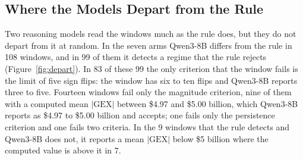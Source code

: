 \subsection{Where the Models Depart from the Rule}
\label{sec:results:departures}

Two reasoning models read the windows much as the rule does, but they do not depart from it at random. In the seven arms Qwen3-8B differs from the rule in 108 windows, and in 99 of them it detects a regime that the rule rejects (Figure~\ref{fig:depart}). In 83 of these 99 the only criterion that the window fails is the limit of five sign flips: the window has six to ten flips and Qwen3-8B reports three to five. Fourteen windows fail only the magnitude criterion, nine of them with a computed mean $|\mathrm{GEX}|$ between \$4.97 and \$5.00 billion, which Qwen3-8B reports as \$4.97 to \$5.00 billion and accepts; one fails only the persistence criterion and one fails two criteria. In the 9 windows that the rule detects and Qwen3-8B does not, it reports a mean $|\mathrm{GEX}|$ below \$5 billion where the computed value is above it in 7.


